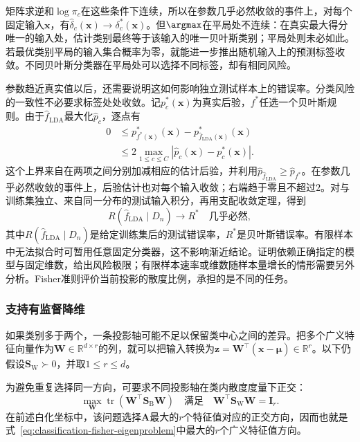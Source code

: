 矩阵求逆和$\log\pi_c$在这些条件下连续，所以在参数几乎必然收敛的事件上，对每个固定输入$\bm{x}$，有$\hat\delta_c(\bm{x})\to\delta_c^\ast(\bm{x})$。但$\argmax$在平局处不连续：在真实最大得分唯一的输入处，估计类别最终等于该输入的唯一贝叶斯类别；平局处则未必如此。若最优类别平局的输入集合概率为零，就能进一步推出随机输入上的预测标签收敛。不同贝叶斯分类器在平局处可以选择不同标签，却有相同风险。

参数趋近真实值以后，还需要说明这如何影响独立测试样本上的错误率。分类风险的一致性不必要求标签处处收敛。记$p_c^\ast(\bm{x})$为真实后验，$f^\ast$任选一个贝叶斯规则。由于$\hat f_{\mathrm{LDA}}$最大化$\hat p_c$，逐点有
\begin{equation}
  \label{eq:classification-lda-excess-risk}
  \begin{aligned}
    0&\leq p_{f^\ast(\bm{x})}^\ast(\bm{x})
      -p_{\hat f_{\mathrm{LDA}}(\bm{x})}^\ast(\bm{x})\\
      &\leq 2\max_{1\leq c\leq C}
          |\hat p_c(\bm{x})-p_c^\ast(\bm{x})| .
  \end{aligned}
\end{equation}
这个上界来自在两项之间分别加减相应的估计后验，并利用$\hat p_{\hat f_{\mathrm{LDA}}}\geq\hat p_{f^\ast}$。在参数几乎必然收敛的事件上，后验估计也对每个输入收敛；右端趋于零且不超过$2$。对与训练集独立、来自同一分布的测试输入积分，再用支配收敛定理，得到
\[
  R(\hat f_{\mathrm{LDA}}\mid D_n)
    \longrightarrow R^\ast
    \quad\text{几乎必然},
\]
其中$R(\hat f_{\mathrm{LDA}}\mid D_n)$是给定训练集后的测试错误率，$R^\ast$是贝叶斯错误率。有限样本中无法拟合时可暂用任意固定分类器，这不影响渐近结论。证明依赖正确指定的模型与固定维数，给出风险极限；有限样本速率或维数随样本量增长的情形需要另外分析。Fisher准则评价当前投影的散度比例，承担的是不同的任务。

\subsubsection{支持有监督降维}
\label{sec:classification-lda-reduction}

如果类别多于两个，一条投影轴可能不足以保留类中心之间的差异。把多个广义特征向量作为$\bm{W}\in\mathbb{R}^{d\times r}$的列，就可以把输入转换为$\bm{z}=\bm{W}^{\top}(\bm{x}-\hat{\bm{\mu}})\in\mathbb{R}^{r}$。以下仍假设$\bm{S}_{\mathrm{W}}\succ0$，并取$1\leq r\leq d$。

为避免重复选择同一方向，可要求不同投影轴在类内散度度量下正交：
\begin{equation}
  \label{eq:classification-lda-subspace}
  \max_{\bm{W}}\operatorname{tr}
       (\bm{W}^{\top}\bm{S}_{\mathrm{B}}\bm{W})
  \quad\text{满足}\quad
  \bm{W}^{\top}\bm{S}_{\mathrm{W}}\bm{W}=\bm{I}_r .
\end{equation}
在前述白化坐标中，该问题选择$\bm{A}$最大的$r$个特征值对应的正交方向，因而也就是式~\eqref{eq:classification-fisher-eigenproblem}中最大的$r$个广义特征值方向。

